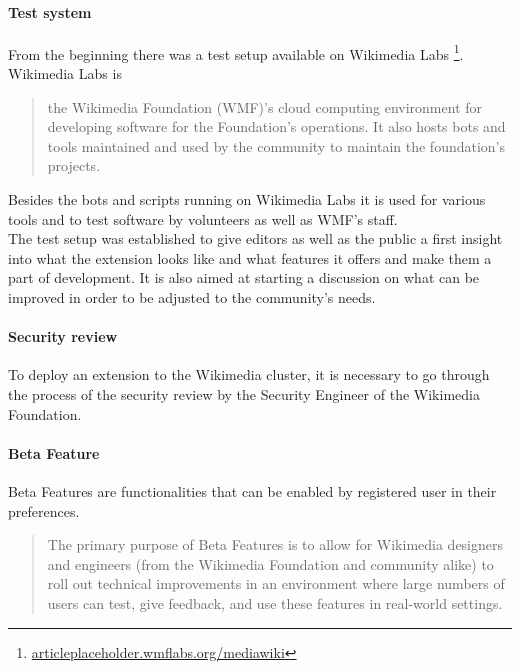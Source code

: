   \paragraph{Test system}
  From the beginning there was a test setup available on Wikimedia Labs \footnote{\href{articleplaceholder.wmflabs.org/mediawiki}{articleplaceholder.wmflabs.org/mediawiki}}. Wikimedia Labs is 
	\begin{quotation}
		the Wikimedia Foundation (WMF)'s cloud computing environment for developing software for the Foundation's operations. It also hosts bots and tools maintained and used by the community to maintain the foundation's projects. 
	\end{quotation} 
Besides the bots and scripts running on Wikimedia Labs it is used for various tools and to test software by volunteers as well as WMF's staff. \\
The test setup was established to give editors as well as the public a first insight into what the extension looks like and what features it offers and make them a part of development. It is also aimed at starting a discussion on what can be improved in order to be adjusted to the community's needs.

  \paragraph{Security review}
  To deploy an extension to the Wikimedia cluster, it is necessary to go through the process of the security review by the Security Engineer of the Wikimedia Foundation. 
  

  \paragraph{Beta Feature}
  Beta Features are functionalities that can be enabled by registered user in their preferences. 
  \begin{quotation}
	  The primary purpose of Beta Features is to allow for Wikimedia designers and engineers (from the Wikimedia Foundation and community alike) to roll out technical improvements in an environment where large numbers of users can test, give feedback, and use these features in real-world settings.
  \end{quotation}   
  
